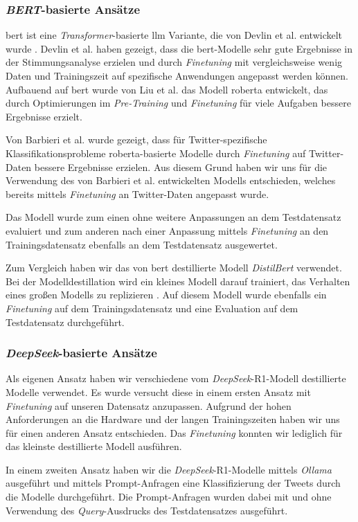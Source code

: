 \subsubsection{\textit{BERT}-basierte Ansätze}\label{subsec:bert}

\gls{bert} ist eine \textit{Transformer}-basierte \gls{llm} Variante, die von Devlin et al. entwickelt wurde \cite{devlin2018bert}.
Devlin et al. haben gezeigt, dass die \gls{bert}-Modelle sehr gute Ergebnisse in der Stimmungsanalyse erzielen und durch \textit{Finetuning} mit vergleichsweise wenig Daten und Trainingszeit auf spezifische Anwendungen angepasst werden können.
Aufbauend auf \gls{bert} wurde von Liu et al. \cite{liu2019roberta} das Modell \gls{roberta} entwickelt, das durch Optimierungen im \textit{Pre-Training} und \textit{Finetuning} für viele Aufgaben bessere Ergebnisse erzielt.

Von Barbieri et al. \cite{barbieri2020tweeteval} wurde gezeigt, dass für Twitter-spezifische Klassifikationsprobleme \gls{roberta}-basierte Modelle durch \textit{Finetuning} auf Twitter-Daten bessere Ergebnisse erzielen.
Aus diesem Grund haben wir uns für die Verwendung des von Barbieri et al. entwickelten Modells entschieden, welches bereits mittels \textit{Finetuning} an Twitter-Daten angepasst wurde.

Das Modell wurde zum einen ohne weitere Anpassungen an dem Testdatensatz evaluiert und zum anderen nach einer Anpassung mittels \textit{Finetuning} an den Trainingsdatensatz ebenfalls an dem Testdatensatz ausgewertet.

Zum Vergleich haben wir das von \gls{bert} destillierte Modell \textit{DistilBert} \cite{sanh2019distilbert} verwendet.
Bei der Modelldestillation wird ein kleines Modell darauf trainiert, das Verhalten eines großen Modells zu replizieren \cite{sanh2019distilbert}.
Auf diesem Modell wurde ebenfalls ein \textit{Finetuning} auf dem Trainingsdatensatz und eine Evaluation auf dem Testdatensatz durchgeführt.


\subsubsection{\textit{DeepSeek}-basierte Ansätze}\label{subsec:deepseek}

Als eigenen Ansatz haben wir verschiedene vom \textit{DeepSeek}-R1-Modell destillierte Modelle \cite{deepseekai2025deepseekr1incentivizingreasoningcapability} verwendet.
Es wurde versucht diese in einem ersten Ansatz mit \textit{Finetuning} auf unseren Datensatz anzupassen.
Aufgrund der hohen Anforderungen an die Hardware und der langen Trainingszeiten haben wir uns für einen anderen Ansatz entschieden. Das \textit{Finetuning} konnten wir lediglich für das kleinste destillierte Modell ausführen.

In einem zweiten Ansatz haben wir die \textit{DeepSeek}-R1-Modelle mittels \textit{Ollama} \cite{ollama2025meta} ausgeführt und mittels Prompt-Anfragen eine Klassifizierung der Tweets durch die Modelle durchgeführt.
Die Prompt-Anfragen wurden dabei mit und ohne Verwendung des \textit{Query}-Ausdrucks des Testdatensatzes ausgeführt.
